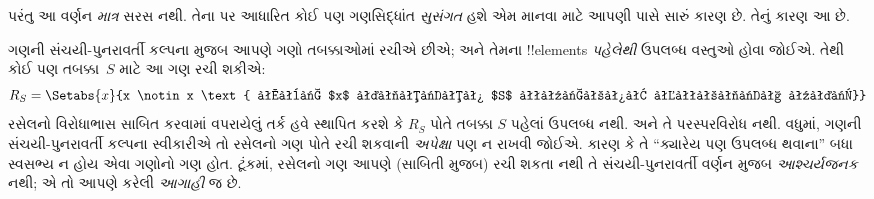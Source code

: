 \documentclass[../../../include/open-logic-section]{subfiles}
\begin{document}
પરંતુ આ વર્ણન \emph{માત્ર} સરસ નથી. તેના પર આધારિત કોઈ પણ
ગણસિદ્ધાંત \emph{સુસંગત} હશે એમ માનવા માટે આપણી પાસે સારું
કારણ છે. તેનું કારણ આ છે.

ગણની સંચયી-પુનરાવર્તી કલ્પના મુજબ આપણે ગણો તબક્કાઓમાં રચીએ
છીએ; અને તેમના !!{element}s \emph{પહેલેથી} ઉપલબ્ધ વસ્તુઓ
હોવા જોઈએ. તેથી કોઈ પણ તબક્કા~$S$ માટે આ ગણ રચી શકીએ:
\[
R_S = \Setabs{x}{x \notin x \text{ અને $x$ તબક્કા $S$ પહેલાં ઉપલબ્ધ હતો}}
\]
રસેલનો વિરોધાભાસ સાબિત કરવામાં વપરાયેલું તર્ક હવે સ્થાપિત
કરશે કે $R_S$ પોતે તબક્કા $S$ પહેલાં ઉપલબ્ધ નથી. અને તે
પરસ્પરવિરોધ નથી. વધુમાં, ગણની સંચયી-પુનરાવર્તી કલ્પના
સ્વીકારીએ તો રસેલનો ગણ પોતે રચી શકવાની \emph{અપેક્ષા} પણ
ન રાખવી જોઈએ. કારણ કે તે ``ક્યારેય પણ ઉપલબ્ધ થવાના'' બધા
સ્વસભ્ય ન હોય એવા ગણોનો ગણ હોત. ટૂંકમાં, રસેલનો ગણ આપણે
(સાબિતી મુજબ) રચી શકતા નથી તે સંચયી-પુનરાવર્તી વર્ણન મુજબ
\emph{આશ્ચર્યજનક} નથી; એ તો આપણે કરેલી \emph{આગાહી} જ છે.

%

\end{document}
